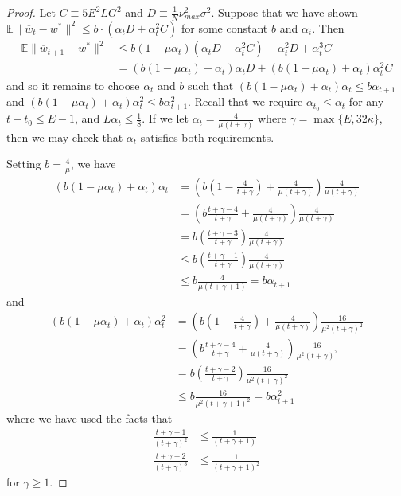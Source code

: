 \begin{proof}
	Let $C\equiv5E^{2}LG^{2}$ and $D\equiv\frac{1}{N}\nu_{max}^{2}\sigma^{2}$.
	Suppose that we have shown $\mathbb{E}\|\overline{w}_{t}-w^{\ast}\|^{2}\leq b\cdot(\alpha_{t}D+\alpha_{t}^{2}C)$
	for some constant $b$ and $\alpha_{t}$. Then 
	\begin{align*}
	\mathbb{E}\|\overline{w}_{t+1}-w^{\ast}\|^{2} & \leq b(1-\mu\alpha_{t})(\alpha_{t}D+\alpha_{t}^{2}C)+\alpha_{t}^{2}D+\alpha_{t}^{3}C\\
	& =(b(1-\mu\alpha_{t})+\alpha_{t})\alpha_{t}D+(b(1-\mu\alpha_{t})+\alpha_{t})\alpha_{t}^{2}C
	\end{align*}
	and so it remains to choose $\alpha_{t}$ and $b$ such that $(b(1-\mu\alpha_{t})+\alpha_{t})\alpha_{t}\leq b\alpha_{t+1}$
	and $(b(1-\mu\alpha_{t})+\alpha_{t})\alpha_{t}^{2}\leq b\alpha_{t+1}^{2}$.
	Recall that we require $\alpha_{t_{0}}\leq\alpha_{t}$ for any $t-t_{0}\leq E-1$,
	and $L\alpha_{t}\leq\frac{1}{8}$. If we let $\alpha_{t}=\frac{4}{\mu(t+\gamma)}$
	where $\gamma=\max\{E,32\kappa\}$, then we may check that $\alpha_{t}$
	satisfies both requirements. 
	
	Setting $b=\frac{4}{\mu}$, we have 
	\begin{align*}
	(b(1-\mu\alpha_{t})+\alpha_{t})\alpha_{t} & =\left(b(1-\frac{4}{t+\gamma})+\frac{4}{\mu(t+\gamma)}\right)\frac{4}{\mu(t+\gamma)}\\
	& =\left(b\frac{t+\gamma-4}{t+\gamma}+\frac{4}{\mu(t+\gamma)}\right)\frac{4}{\mu(t+\gamma)}\\
	& =b(\frac{t+\gamma-3}{t+\gamma})\frac{4}{\mu(t+\gamma)}\\
	& \leq b(\frac{t+\gamma-1}{t+\gamma})\frac{4}{\mu(t+\gamma)}\\
	& \leq b\frac{4}{\mu(t+\gamma+1)}=b\alpha_{t+1}
	\end{align*}
	and 
	\begin{align*}
	(b(1-\mu\alpha_{t})+\alpha_{t})\alpha_{t}^{2} & =\left(b(1-\frac{4}{t+\gamma})+\frac{4}{\mu(t+\gamma)}\right)\frac{16}{\mu^{2}(t+\gamma)^{2}}\\
	& =\left(b\frac{t+\gamma-4}{t+\gamma}+\frac{4}{\mu(t+\gamma)}\right)\frac{16}{\mu^{2}(t+\gamma)^{2}}\\
	& =b(\frac{t+\gamma-2}{t+\gamma})\frac{16}{\mu^{2}(t+\gamma)^{2}}\\
	& \leq b\frac{16}{\mu^{2}(t+\gamma+1)^{2}}=b\alpha_{t+1}^{2}
	\end{align*}
	where we have used the facts that 
	\begin{align*}
	\frac{t+\gamma-1}{(t+\gamma)^{2}} & \leq\frac{1}{(t+\gamma+1)}\\
	\frac{t+\gamma-2}{(t+\gamma)^{3}} & \leq\frac{1}{(t+\gamma+1)^{2}}
	\end{align*}
	for $\gamma\geq1$.
	

\end{proof}
